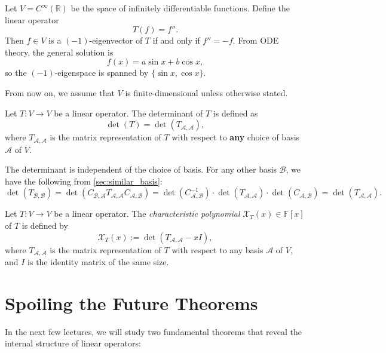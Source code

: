 \begin{example}
Let \( V = C^\infty(\mathbb{R}) \) be the space of infinitely differentiable functions. Define the linear operator
\[
T(f) = f''.
\]
Then \( f \in V \) is a \((-1)\)-eigenvector of \(T\) if and only if \( f'' = -f \). From ODE theory, the general solution is
\[
f(x) = a \sin x + b \cos x,
\]
so the \((-1)\)-eigenspace is spanned by \( \{ \sin x, \cos x \} \).
\end{example}

From now on, we assume that \(V\) is finite-dimensional unless otherwise stated.

\begin{definition}\label{def:determinant}
Let \( T : V \to V \) be a linear operator. The determinant of \(T\) is defined as
\[
\det(T) = \det(T_{\mathcal{A}, \mathcal{A}}),
\]
where \(T_{\mathcal{A}, \mathcal{A}}\) is the matrix representation of \(T\) with respect to {\bf any} choice of basis \(\mathcal{A}\) of \(V\).
\end{definition}

\begin{remark}
The determinant is independent of the choice of basis. For any other basis \(\mathcal{B}\), we have the following from \autoref{sec:similar_basis}:
\[
\det(T_{\mathcal{B}, \mathcal{B}}) = 
\det(C_{\mathcal{B}, \mathcal{A}} T_{\mathcal{A}, \mathcal{A}} C_{\mathcal{A}, \mathcal{B}}) 
= \det(C_{\mathcal{A}, \mathcal{B}}^{-1}) \cdot \det(T_{\mathcal{A}, \mathcal{A}}) \cdot \det(C_{\mathcal{A}, \mathcal{B}}) 
= \det(T_{\mathcal{A}, \mathcal{A}}).
\]
\end{remark}

\begin{definition}\label{def:char-poly}
Let \( T : V \to V \) be a linear operator. The \emph{characteristic polynomial} \( \mathcal{X}_T(x) \in \mathbb{F}[x] \) of \(T\) is defined by
\[
\mathcal{X}_T(x) := \det\left( T_{\mathcal{A},\mathcal{A}} - x I \right),
\]
where \(T_{\mathcal{A},\mathcal{A}}\) is the matrix representation of \(T\) with respect to any basis \(\mathcal{A}\) of \(V\), and \(I\) is the identity matrix of the same size.
\end{definition}

\section{Spoiling the Future Theorems}

In the next few lectures, we will study two fundamental theorems that reveal the internal structure of linear operators:

